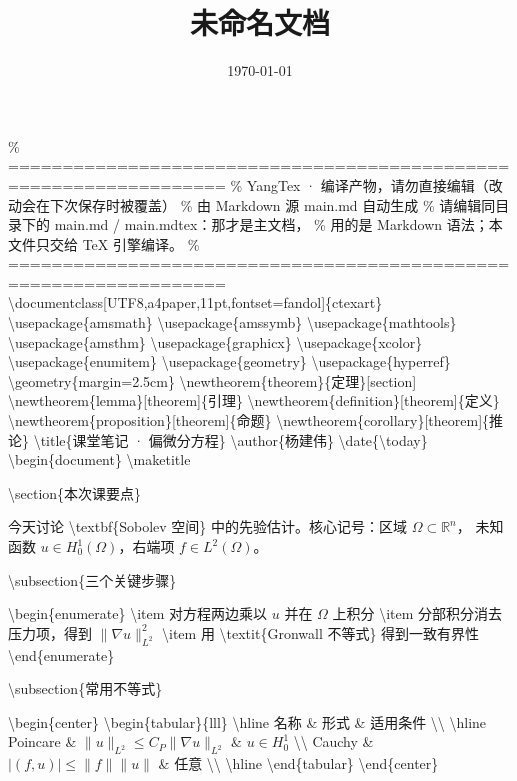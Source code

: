 \documentclass[UTF8,a4paper,11pt,fontset=fandol]{ctexart}
\title{未命名文档}
\author{}
\date{\today}
\begin{document}
\maketitle

\% ================================================================== \% YangTex · 编译产物，请勿直接编辑（改动会在下次保存时被覆盖） \% 由 Markdown 源 main.md 自动生成 \% 请编辑同目录下的 main.md / main.mdtex：那才是主文档， \% 用的是 Markdown 语法；本文件只交给 TeX 引擎编译。 \% ================================================================== \textbackslash{}documentclass[UTF8,a4paper,11pt,fontset=fandol]\{ctexart\} \textbackslash{}usepackage\{amsmath\} \textbackslash{}usepackage\{amssymb\} \textbackslash{}usepackage\{mathtools\} \textbackslash{}usepackage\{amsthm\} \textbackslash{}usepackage\{graphicx\} \textbackslash{}usepackage\{xcolor\} \textbackslash{}usepackage\{enumitem\} \textbackslash{}usepackage\{geometry\} \textbackslash{}usepackage\{hyperref\} \textbackslash{}geometry\{margin=2.5cm\} \textbackslash{}newtheorem\{theorem\}\{定理\}[section] \textbackslash{}newtheorem\{lemma\}[theorem]\{引理\} \textbackslash{}newtheorem\{definition\}[theorem]\{定义\} \textbackslash{}newtheorem\{proposition\}[theorem]\{命题\} \textbackslash{}newtheorem\{corollary\}[theorem]\{推论\} \textbackslash{}title\{课堂笔记 · 偏微分方程\} \textbackslash{}author\{杨建伟\} \textbackslash{}date\{\textbackslash{}today\} \textbackslash{}begin\{document\} \textbackslash{}maketitle

\textbackslash{}section\{本次课要点\}

今天讨论 \textbackslash{}textbf\{Sobolev 空间\} 中的先验估计。核心记号：区域 $\Omega \subset \mathbb{R}^n$， 未知函数 $u \in H^1_0(\Omega)$，右端项 $f \in L^2(\Omega)$。

\textbackslash{}subsection\{三个关键步骤\}

\textbackslash{}begin\{enumerate\} \textbackslash{}item 对方程两边乘以 $u$ 并在 $\Omega$ 上积分 \textbackslash{}item 分部积分消去压力项，得到 $\|\nabla u\|_{L^2}^2$ \textbackslash{}item 用 \textbackslash{}textit\{Gronwall 不等式\} 得到一致有界性 \textbackslash{}end\{enumerate\}

\textbackslash{}subsection\{常用不等式\}

\textbackslash{}begin\{center\} \textbackslash{}begin\{tabular\}\{l\textbar{}l\textbar{}l\} \textbackslash{}hline 名称 \& 形式 \& 适用条件 \textbackslash{}\textbackslash{} \textbackslash{}hline Poincare \& $\|u\|_{L^2} \le C_P \|\nabla u\|_{L^2}$ \& $u \in H^1_0$ \textbackslash{}\textbackslash{} Cauchy \& $|(f,u)| \le \|f\| \|u\|$ \& 任意 \textbackslash{}\textbackslash{} \textbackslash{}hline \textbackslash{}end\{tabular\} \textbackslash{}end\{center\}
\end{document}
